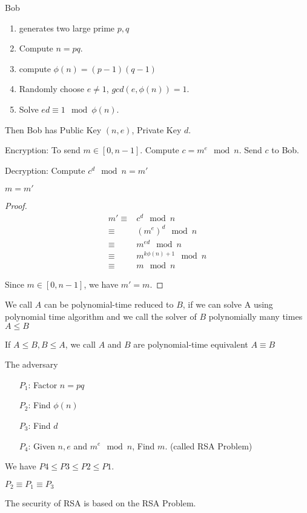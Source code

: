 \begin{algorithm}
Bob 
\begin{enumerate}
\item generates two large prime $p,q$
\item Compute $n = pq$. 
\item compute $\phi (n) = (p-1) (q-1)$
\item Randomly choose $e\neq 1$, $gcd(e,\phi (n)) = 1$.
\item Solve $ed \equiv 1 \mod \phi (n)$.
\end{enumerate} 
Then Bob has Public Key $(n,e)$, Private Key $d$.

Encryption: To send $m\in [0,n-1]$. Compute $c = m^e \mod n$. Send $c$ to Bob.

Decryption: Compute $c^d \mod n = m'$
\end{algorithm}

\begin{claim}
$m = m'$
\end{claim}
\begin{proof}
\begin{align*}
    m' \equiv & c^d \mod n\\
    \equiv & {(m^e)}^d \mod n\\
    \equiv & m^{ed} \mod n \\
    \equiv & m^{k\phi(n) + 1} \mod n\\
    \equiv & m \mod n
\end{align*}

Since $m \in [0,n-1]$, we have $m' = m$.
\end{proof}


\begin{defn}
    We call $A$ can be polynomial-time reduced to $B$, if we can solve A using polynomial time algorithm and we call the solver of $B$ polynomially many times $A \leq B$
    
    If $A \leq B, B\leq A$, we call $A$ and $B$ are polynomial-time equivalent $A \equiv B$
\end{defn}

The adversary 
\begin{enumerate}
\item[$P_1$:] Factor $n=pq$
\item[$P_2$:] Find $\phi(n)$
\item[$P_3$:] Find $d$ 
\item[$P_4$:] Given $n,e$ and $m^e \mod n$, Find $m$. (called RSA Problem)
\end{enumerate}

We have $P4\leq P3 \leq P2 \leq P1$.

\begin{claim}
$P_2 \equiv P_1\equiv P_3$
\end{claim}

The security of RSA is based on the RSA Problem.
